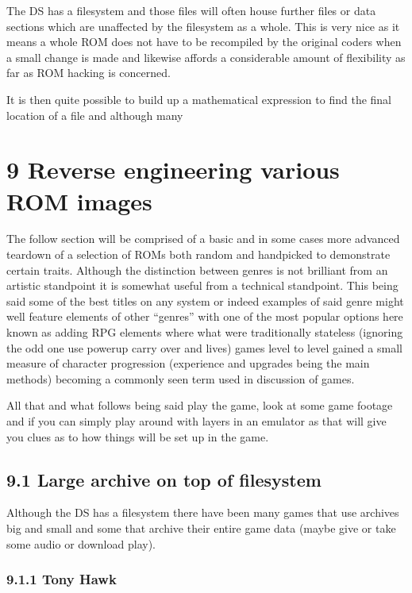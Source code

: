 \documentclass[
]{book}
\begin{document}
The DS has a filesystem and those files will often house further files or data sections which are unaffected by the filesystem as a whole. This is very nice as it means a whole ROM does not have to be recompiled by the original coders when a small change is made and likewise affords a considerable amount of flexibility as far as ROM hacking is concerned.

It is then quite possible to build up a mathematical expression to find the final location of a file and although many

\hypertarget{reverse-engineering-various-rom-images}{%
\chapter{9 Reverse engineering various ROM images}\label{reverse-engineering-various-rom-images}}

The follow section will be comprised of a basic and in some cases more advanced teardown of a selection of ROMs both random and handpicked to demonstrate certain traits. Although the distinction between genres is not brilliant from an artistic standpoint it is somewhat useful from a technical standpoint. This being said some of the best titles on any system or indeed examples of said genre might well feature elements of other ``genres'' with one of the most popular options here known as adding RPG elements where what were traditionally stateless (ignoring the odd one use powerup carry over and lives) games level to level gained a small measure of character progression (experience and upgrades being the main methods) becoming a commonly seen term used in discussion of games.

All that and what follows being said play the game, look at some game footage and if you can simply play around with layers in an emulator as that will give you clues as to how things will be set up in the game.

\hypertarget{large-archive-on-top-of-filesystem}{%
\section{9.1 Large archive on top of filesystem}\label{large-archive-on-top-of-filesystem}}

Although the DS has a filesystem there have been many games that use archives big and small and some that archive their entire game data (maybe give or take some audio or download play).

\hypertarget{tony-hawk}{%
\subsection{9.1.1 Tony Hawk}\label{tony-hawk}}
\end{document}
